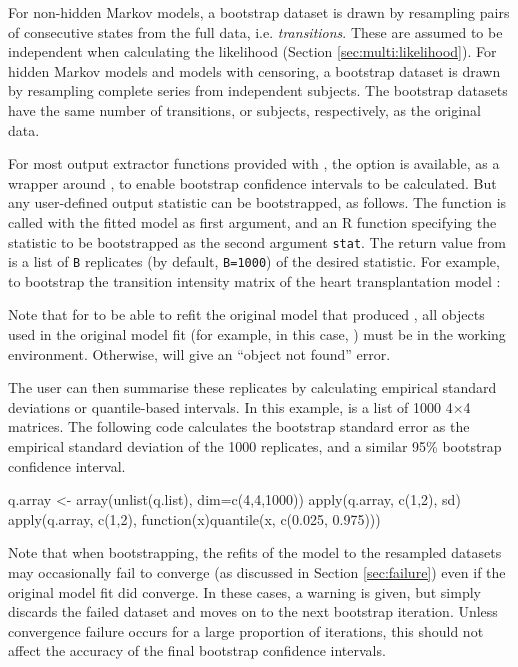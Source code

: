 For non-hidden Markov models, a bootstrap dataset is drawn by
resampling pairs of consecutive states from the full data, i.e.
\emph{transitions}.  These are assumed to be independent when
calculating the likelihood (Section \ref{sec:multi:likelihood}).  For
hidden Markov models and models with censoring, a bootstrap dataset is
drawn by resampling complete series from independent subjects.  The
bootstrap datasets have the same number of transitions, or subjects,
respectively, as the original data.

For most output extractor functions provided with , the
option  is available, as a wrapper around
, to enable bootstrap confidence intervals to be calculated.
But any user-defined output statistic can be bootstrapped, as follows.
The function  is called with the fitted
 model as first argument, and an R function specifying
the statistic to be bootstrapped as the second argument \texttt{stat}.
The return value from  is a list of \texttt{B}
replicates (by default, \texttt{B=1000}) of the desired statistic.  For
example, to bootstrap the transition intensity matrix of the heart
transplantation model :
Note that for  to be able to refit the original
model that produced , all objects used in the
original model fit (for example, in this case, )
must be in the working environment.  Otherwise, 
will give an ``object not found'' error.

The user can then summarise these replicates by calculating empirical
standard deviations or quantile-based intervals.  In this example,
 is a list of 1000 4$\times$4 matrices.  The following
code calculates the bootstrap standard error as the empirical standard
deviation of the 1000 replicates, and a similar 95\% bootstrap
confidence interval.
\begin{Scode}
  q.array <- array(unlist(q.list), dim=c(4,4,1000))
  apply(q.array, c(1,2), sd)
  apply(q.array, c(1,2), function(x)quantile(x, c(0.025, 0.975)))
\end{Scode}

Note that when bootstrapping, the refits of the model to the resampled
datasets may occasionally fail to converge (as discussed in
Section \ref{sec:failure}) even if the original model fit did
converge.  In these cases, a warning is given, but
 simply discards the failed dataset and moves on
to the next bootstrap iteration. Unless convergence failure occurs for
a large proportion of iterations, this should not affect the accuracy
of the final bootstrap confidence intervals.


